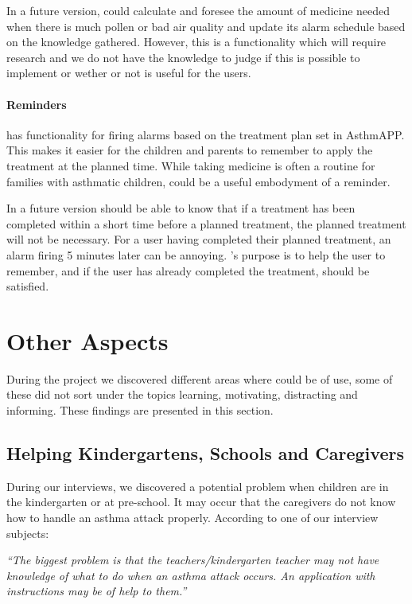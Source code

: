 In a future version, \buddy{} could calculate and foresee the amount of medicine needed when there is much pollen or bad air quality and update its alarm schedule based on the knowledge gathered. However, this is a functionality which will require research and we do not have the knowledge to judge if this is possible to implement or wether or not is useful for the users. 


\paragraph{Reminders}
\buddy{} has functionality for firing alarms based on the treatment plan set in AsthmAPP. This makes it easier for the children and parents to remember to apply the treatment at the planned time. While taking medicine is often a routine for families with asthmatic children, \buddy{} could be a useful embodyment of a reminder. 

In a future version \buddy{} should be able to know that if a treatment has been completed within a short time before a planned treatment, the planned treatment will not be necessary. For a user having completed their planned treatment, an alarm firing 5 minutes later can be annoying. \buddy{}'s purpose is to help the user to remember, and if the user has already completed the treatment, \ab{} should be satisfied. 

\section{Other Aspects}
\label{sec:otheraspects}
During the project we discovered different areas where \ab{} could be of use, some of these did not sort under the topics learning, motivating, distracting and informing. These findings are presented in this section.

\subsection{Helping Kindergartens, Schools and Caregivers}
During our interviews, we discovered a potential problem when children are in the kindergarten or at pre-school. It may occur that the caregivers do not know how to handle an asthma attack properly. According to one of our interview subjects: 

\textit{``The biggest problem is that the teachers/kindergarten teacher may not have knowledge of what to do when an asthma attack occurs. An application with instructions may be of help to them.''}

